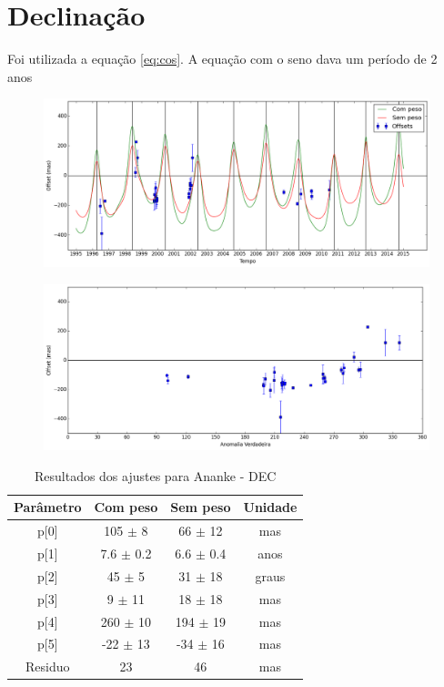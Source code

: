\documentclass[11pt,a4paper]{report}
\begin{document}
\section*{Declinação}

Foi utilizada a equação \ref{eq:cos}. A equação com o seno dava um período de 2 anos

\begin{figure}[h]
\begin{centering}
\includegraphics[scale=0.45]{Ananke/DEC.png}
\end{centering}
\end{figure}

\begin{figure}[h]
\includegraphics[scale=0.45]{Ananke/DEC_anom.png}  
\end{figure}

\begin{table}[h!]
\caption{\label{Tab: Ananke-DEC} Resultados dos ajustes para Ananke - DEC}
\begin{centering}
\begin{tabular}{cccc}
\hline
\hline
Parâmetro & Com peso & Sem peso & Unidade\tabularnewline
\hline
p[0] & 105 $\pm$ 8 & 66 $\pm$ 12 & mas\\
p[1] & 7.6 $\pm$ 0.2 & 6.6 $\pm$ 0.4 & anos\\
p[2] & 45 $\pm$ 5 & 31 $\pm$ 18 & graus\\
p[3] & 9 $\pm$ 11 & 18 $\pm$ 18 & mas\\
p[4] & 260 $\pm$ 10 & 194 $\pm$ 19 & mas\\
p[5] & -22 $\pm$ 13 & -34 $\pm$ 16 & mas\\
Residuo & 23 & 46 & mas\\
\hline 
\end{tabular} 
\par\end{centering}
\end{table}
\end{document}
